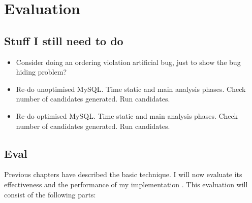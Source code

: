 \chapter{Evaluation}
\label{chapter:eval}

\section{Stuff I still need to do}

\begin{itemize}
\item Consider doing an ordering violation artificial bug, just to
  show the bug hiding problem?
\item Re-do unoptimised MySQL.  Time static and main analysis phases.
  Check number of candidates generated.  Run candidates.
\item Re-do optimised MySQL.  Time static and main analysis phases.
  Check number of candidates generated.  Run candidates.
\end{itemize}

\section{Eval}

Previous chapters have described the basic {\technique} technique.  I
will now evaluate its effectiveness and the performance of my
implementation {\implementation}.  This evaluation will consist of the
following parts:

